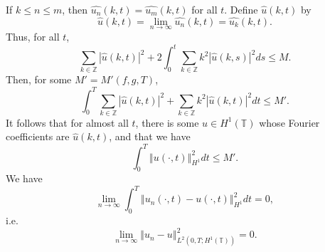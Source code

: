 \documentclass{article}
\newcommand{\norm}[1]{\left\Vert #1 \right\Vert}
\begin{document}
If $k \leq n \leq m$, then $\widehat{u_n}(k,t)=\widehat{u_m}(k,t)$ for all $t$. Define $\hat{u}(k,t)$ by 
\[
\hat{u}(k,t)
=\lim_{n \to \infty} \widehat{u_n}(k,t)=\widehat{u_k}(k,t).
\]
Thus, for all $t$,
\begin{equation}
\sum_{k \in \mathbb{Z}} |\hat{u}(k,t)|^2+2\int_0^t \sum_{k \in \mathbb{Z}} k^2 |\hat{u}(k,s)|^2 ds \leq M.
\label{k0}
\end{equation}
Then, for some $M'=M'(f,g,T)$,
\[
\int_0^T \sum_{k \in \mathbb{Z}} |\hat{u}(k,t)|^2+ \sum_{k \in \mathbb{Z}} k^2 |\hat{u}(k,t)|^2 dt \leq M'.
\]
It follows that for almost all $t$, there is some $u \in H^1(\mathbb{T})$ whose Fourier coefficients are $\hat{u}(k,t)$, and that we have
\[
\int_0^T \norm{u(\cdot,t)}_{H^1}^2 dt \leq M'.
\]
We have
\[
\lim_{n \to \infty} \int_0^T \norm{u_n(\cdot,t)-u(\cdot,t)}_{H^1}^2 dt=0,
\]
i.e.
\[
\lim_{n \to \infty} \norm{u_n -u}_{L^2(0,T;H^1(\mathbb{T}))}^2 = 0.
\]
\end{document}
